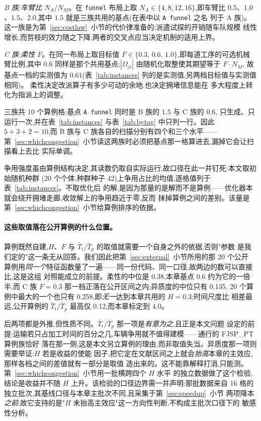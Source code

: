 \documentclass[manuscript,screen,review]{acmart}
\newcommand{\NCases}{10}
\newcommand{\MatrixCells}{16}
\newcommand{\PubFMed}{0.38}              %
\newcommand{\PubHMed}{0.135}             %
\newcommand{\PubHMax}{0.258}             %
\newcommand{\PubTtTpHi}{0.12}            %
\newcommand{\PubNInst}{20}
\begin{document}
\emph{B 族:车臂比 $N_A/N_M$}。在 \texttt{funnel} 布局上取 $N_A\in\{4,8,12,16\}$,即车臂比
$0.5$、$1.0$、$1.5$、$2.0$,其中 $1.5$ 就是三族共用的基点(在表中以 \texttt{A funnel} 之名
列于 A 族)。这一族是为第~\ref{sec:costlaw}~小节的代价律准备的:派遣试探的开销随车队规模
线性增长,而剪枝的效力随之下降,两者的交叉点应当决定机制的适用上界。

\emph{C 族:柔性 $F$}。在同一布局上取目标值 $F\in\{0.3,\,0.6,\,1.0\}$,即每道工序的可选机械
臂比例,其中 $0.6$ 同样是那个共用基点;$|\Omega_{ji}|$ 由随机化取整使其期望等于 $F\cdot N_M$,
故基点一档的实测值为 $0.61$(表~\ref{tab:instances} 列的是实测值,另两档目标值与实测值相同)。
柔性决定改派算子有多少可动的余地,也决定拥堵信息能在
多大程度上转化为指派上的调整。

三族共 $\NCases$ 个算例格:基点 \texttt{A funnel} 同时是 B 族的 $1.5$ 与 C 族的 $0.6$,
只生成、只运行一次,并在表~\ref{tab:instances} 与表~\ref{tab:bytag} 中只列一行。因此
$5+3+2=\NCases$,而 B 族与 C 族各自的扫描分别有四个和三个水平——
第~\ref{sec:whichcongestion}~小节读这两族时必须把基点那一格算进去,漏掉它会让扫描看上去比
实际单调。

争用强度虽由算例结构决定,其读数仍取自实际运行,故口径在此一并钉死:本文取初始随机种群
($20$ 个个体,种群种子 $42$)上争用占比的均值,逐格值列于表~\ref{tab:instances}。不取优化后
的解,是因为那量的是解而不是算例——优化器本就会绕开拥堵走廊,收敛解上的争用趋近于零,反而
抹掉算例之间的差别。该量是第~\ref{sec:whichcongestion}~小节给算例排序的依据。

\paragraph{这些取值落在公开算例的什么位置。}
算例既然自建,$H$、$F$ 与 $\bar{T}_t/\bar{T}_p$ 的取值就需要一个自身之外的依据,否则"参数
是我们定的"这一条无从回答。我们因此把第~\ref{sec:external}~小节所用的那 \PubNInst{} 个公开
算例用\emph{同一个}特征函数量了一遍——同一份代码、同一口径,故两边的数可以直接比,这是这组
对照能成立的前提。柔性的中位是 \PubFMed{},本章基点
$0.6$ 约为它的一倍半,而 C 族 $F=0.3$ 那一档正落在公开区间之内;异质度的中位只有 \PubHMed{},
\PubNInst{} 个算例中最大的一个也只有 \PubHMax{},即\emph{无一}达到本章共用的 $H=0.3$;时间尺度比
相差最远,公开算例的 $\bar{T}_t/\bar{T}_p$ 最高仅 \PubTtTpHi{},而本章标定到 $4.0$。

后两项都是外推,但性质不同。$\bar{T}_t/\bar{T}_p$ 那一项是\emph{有意为之},且正是本文问题
设定的前提:运输若只占加工时间的百分之几,车辆争用就不值得建模——通行的 FJSP\_PT 算例族恰好
落在那一侧,这是本文另立算例的理由,而非取值失当。异质度那一项则需要举证:$H$ 若是收益的使能
因子,把它定在文献区间之上就会\emph{抬高}本章的主效应,那样各档之间的差值就有一部分是取值
造出来的。这不能靠解释打消,只能测。第~\ref{sec:whichcongestion}~小节用一批横跨四个 $H$ 水平
的独立数据做了这个检验,结论是收益并不随 $H$ 上升。该检验的口径边界需一并声明:那批数据来自
\MatrixCells{} 格的独立批次,其基线口径与本章主批次不同,且采集于第~\ref{sec:speedup}~小节
两项降本\emph{之前};故它支持的是"$H$ 未抬高主效应"这一方向性判断,不构成主批次口径下的
敏感性分析。
\end{document}
